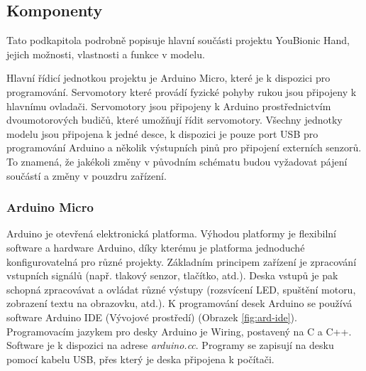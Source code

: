\documentclass[thesis=B,czech]{FITthesis}[2012/06/26]
\begin{document}
\subsection{Komponenty}
\label{subsec:Komp}

Tato podkapitola podrobně popisuje hlavní součásti projektu YouBionic Hand, jejich možnosti, vlastnosti a funkce v modelu. 

Hlavní řídicí jednotkou projektu je Arduino Micro, které je k dispozici pro programování. Servomotory které provádí fyzické pohyby rukou jsou připojeny k hlavnímu ovladači. Servomotory jsou připojeny k Arduino prostřednictvím dvoumotorových budičů, které umožňují řídit servomotory. Všechny jednotky modelu jsou připojena k jedné desce, k dispozici je pouze port USB pro programování Arduino a několik výstupních pinů pro připojení externích senzorů. To znamená, že jakékoli změny v původním schématu budou vyžadovat pájení součástí a změny v pouzdru zařízení.


\subsubsection{Arduino Micro}

Arduino je otevřená elektronická platforma. Výhodou platformy je flexibilní software a hardware Arduino, díky kterému je platforma jednoduché konfigurovatelná pro různé projekty. Základním principem zařízení je zpracování vstupních signálů (např. tlakový senzor, tlačítko, atd.).  Deska vstupů je pak schopná zpracovávat a ovládat různé výstupy (rozsvícení LED, spuštění motoru, zobrazení textu na obrazovku, atd.). K programování desek Arduino se používá software Arduino IDE (Vývojové prostředí) (Obrazek \ref{fig:ard-ide}). Programovacím jazykem pro desky Arduino je Wiring, postavený na C a C++. Software je k dispozici na adrese \textit{arduino.cc}. Programy se zapisují na desku pomocí kabelu USB, přes který je deska připojena k počítači. 
\end{document}
